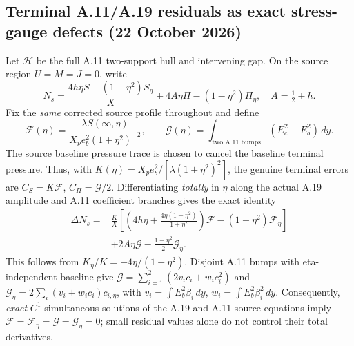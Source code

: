 \subsection*{Terminal A.11/A.19 residuals as exact stress-gauge defects (22 October 2026)}
\label{subsec:A11-source-terminal-residual-lift}
Let \(\mathcal H\) be the full A.11 two-support hull and intervening gap.
On the source region \(U=M=J=0\), write
\[
 N_s=\frac{4h\eta S-(1-\eta^2)S_\eta}{X}
       +4A\eta\Pi-(1-\eta^2)\Pi_\eta,\quad A=\tfrac12+h.
\]
Fix the \emph{same} corrected source profile throughout and define
\[
 \mathcal F(\eta)=\frac{\lambda S(\infty,\eta)}
  {X_pe_b^2(1+\eta^2)^{-2}},\qquad
 \mathcal G(\eta)=\int_{\text{two A.11 bumps}}(E_c^2-E_b^2)\,dy.
\]
The source baseline pressure trace is chosen to cancel the baseline
terminal pressure. Thus, with
\(K(\eta)=X_pe_b^2/[\lambda(1+\eta^2)^2]\),
the genuine terminal errors are \(C_S=K\mathcal F\),
\(C_\Pi=\mathcal G/2\). Differentiating \emph{totally} in \(\eta\)
along the actual A.19 amplitude and A.11 coefficient branches gives
the exact identity
\begin{equation}\label{eq:a11-source-residual-lift-20261022}
\boxed{\begin{aligned}
 \Delta N_s={}&\frac{K}{X}
  \left[\left(4h\eta+
   \frac{4\eta(1-\eta^2)}{1+\eta^2}\right)\mathcal F
          -(1-\eta^2)\mathcal F_\eta\right]\\
 &+2A\eta\mathcal G-\frac{1-\eta^2}{2}\mathcal G_\eta.
\end{aligned}}
\end{equation}
This follows from \(K_\eta/K=-4\eta/(1+\eta^2)\).
Disjoint A.11 bumps with eta-independent baseline give
\(\mathcal G=\sum_{i=1}^2(2v_ic_i+w_ic_i^2)\) and
\(\mathcal G_\eta=2\sum_i(v_i+w_ic_i)c_{i,\eta}\),
with \(v_i=\int E_b^2\beta_i\,dy\), \(w_i=\int E_b^2\beta_i^2\,dy\).
Consequently, \emph{exact} \(C^1\) simultaneous solutions of the
A.19 and A.11 source equations imply
\(\mathcal F=\mathcal F_\eta=\mathcal G=\mathcal G_\eta=0\);
small residual values alone do not control their total derivatives.

